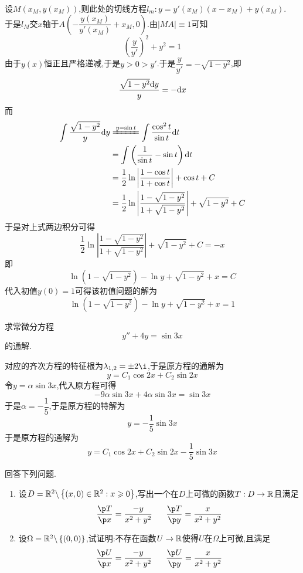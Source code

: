 \documentclass{ctexart}
\begin{document}
\begin{solution}
    设$M(x_M,y\left(x_M\right))$,则此处的切线方程$l_m:y=y'\left(x_M\right)\left(x-x_M\right)+y\left(x_M\right)$.\\
    于是$l_M$交$x$轴于$A\left(-\dfrac{y\left(x_M\right)}{y'\left(x_M\right)}+x_M,0\right)$.由$\left|MA\right|\equiv1$可知
    \[\left(\dfrac{y}{y'}\right)^2+y^2=1\]
    由于$y(x)$恒正且严格递减,于是$y>0>y'$.于是$\dfrac{y}{y'}=-\sqrt{1-y^2}$,即
    \[\dfrac{\sqrt{1-y^2}\mathrm{d} y}{y}=-\mathrm{d} x\]
    而
    \[\begin{aligned}
        \int\dfrac{\sqrt{1-y^2}}{y}\di y
        &\xlongequal{y=\sin t}\int\dfrac{\cos^2 t}{\sin t}\di t \\
        &= \int\left(\dfrac{1}{\sin t}-\sin t\right)\di t \\
        &= \dfrac{1}{2}\ln\left|\dfrac{1-\cos t}{1+\cos t}\right|+\cos t+C \\
        &= \dfrac12\ln\left|\dfrac{1-\sqrt{1-y^2}}{1+\sqrt{1-y^2}}\right|+\sqrt{1-y^2}+C
    \end{aligned}\]
    于是对上式两边积分可得
    \[\dfrac{1}{2}\ln\left|\dfrac{1-\sqrt{1-y^2}}{1+\sqrt{1-y^2}}\right|+\sqrt{1-y^2}+C=-x\]
    即
    \[\ln\left(1-\sqrt{1-y^2}\right)-\ln y+\sqrt{1-y^2}+x=C\]
    代入初值$y(0)=1$可得该初值问题的解为
    \[\ln\left(1-\sqrt{1-y^2}\right)-\ln y+\sqrt{1-y^2}+x=1\]
\end{solution}
\begin{problem}[8.(10\songti{分})]
    求常微分方程
    \[y''+4y=\sin3x\]
    的通解.
\end{problem}
\begin{solution}
    对应的齐次方程的特征根为$\lambda_{1,2}=\pm2\i$,于是原方程的通解为
    \[y=C_1\cos2x+C_2\sin2x\]
    令$y=\alpha\sin3x$,代入原方程可得
    \[-9\alpha\sin3x+4\alpha\sin3x=\sin3x\]
    于是$\alpha=-\dfrac15$,于是原方程的特解为
    \[y=-\dfrac15\sin3x\]
    于是原方程的通解为
    \[y=C_1\cos2x+C_2\sin2x-\dfrac{1}{5}\sin3x\]
\end{solution}
\begin{problem}[9.(10\songti{分})]
    回答下列问题.
    \begin{enumerate}[label=\tbf{(\arabic*)}]
        \item 设$D=\mathbb{R}^2\backslash\left\{(x,0)\in\mathbb{R}^2:x\geqslant 0\right\}$,写出一个在$D$上可微的函数$T:D\to\mathbb{R}$且满足
            \[\dfrac{\p T}{\p x}=\dfrac{-y}{x^2+y^2}\ \ \ \ \ \dfrac{\p T}{\p y}=\dfrac{x}{x^2+y^2}\]
        \item 设$\Omega=\mathbb{R}^2\backslash\left\{(0,0)\right\}$,试证明:不存在函数$U\to\mathbb{R}$使得$U$在$\Omega$上可微,且满足
            \[\dfrac{\p U}{\p x}=\dfrac{-y}{x^2+y^2}\ \ \ \ \ \dfrac{\p U}{\p y}=\dfrac{x}{x^2+y^2}\]
    \end{enumerate}

\end{problem}
\end{document}
